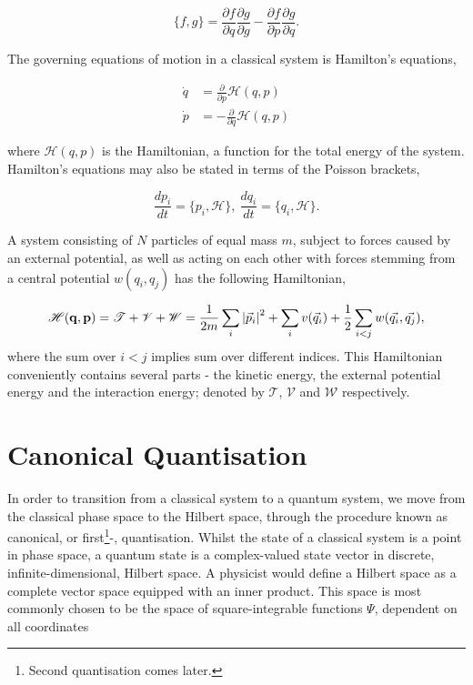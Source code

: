     \begin{equation}
        \label{eq:poisson_bracket}
        \{f, g\} = \frac{\partial f}{\partial q} \frac{\partial g}{\partial g}
        - \frac{\partial f}{\partial p} \frac{\partial g}{\partial q}.
    \end{equation}

    The governing equations of motion in a classical system is Hamilton's equations,

    \begin{align}
        \dot{q} &= \frac{\partial}{\partial p} \mathscr{H}(q, p) \\
        \dot{p} &= -\frac{\partial}{\partial q} \mathscr{H}(q, p)
    \end{align}

    where $\mathscr{H}(q, p)$ is the Hamiltonian, a function for the total energy of the
    system. Hamilton's equations may also be stated in terms of the Poisson brackets,

    \begin{equation}
        \frac{dp_i}{dt} = \{p_i, \mathscr{H}\}, \ \frac{dq_i}{dt} = \{q_i, \mathscr{H}\}.
    \end{equation}

    A system consisting of $N$ particles of equal mass $m$, subject to forces caused by an external
    potential, as well as acting on each other with forces stemming from a central
    potential $w(q_i, q_j)$ has the following Hamiltonian,

    \begin{equation}
        \mathscr{H}(\vb{q}, \vb{p}) = \mathscr{T} + \mathscr{V} + \mathscr{W} 
            = \frac{1}{2m}\sum_{i} \abs{\vec{p}_i}^2 + \sum_{i} v(\vec{q}_i)
                + \frac{1}{2}\sum_{i<j} w(\vec{q_i}, \vec{q_j}),
    \end{equation}
    where the sum over $i<j$ implies sum over different indices. 
    This Hamiltonian conveniently contains several parts - the kinetic energy, the
    external potential energy and the interaction energy; denoted by $\mathscr{T}$,
    $\mathscr{V}$ and $\mathscr{W}$ respectively.

\section{Canonical Quantisation}

    In order to transition from a classical system to a quantum system, we move from 
    the classical phase space to the Hilbert space, through the procedure known as 
    canonical, or first\footnote{Second quantisation comes later.}-, quantisation.
    Whilst the state of a classical system is a point in phase space, a quantum state
    is a complex-valued state vector in discrete, infinite-dimensional, Hilbert space.
    A physicist would define a Hilbert space as a complete vector space equipped
    with an inner product. This space
    is most commonly chosen to be the space of square-integrable functions $\Psi$,
    dependent on all coordinates
    
